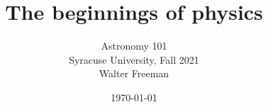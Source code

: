 \documentclass[10pt]{beamer}
\title[The beginnings of physics]{
  \textbf {The beginnings of physics}}
\author [Astronomy 101]{Astronomy 101\\Syracuse University, Fall 2021\\Walter Freeman}
\date{\today}
\begin{document}
\frame{\titlepage}

%
%
%
%
%
%
%
%
%
%
%
%
\end{document}
